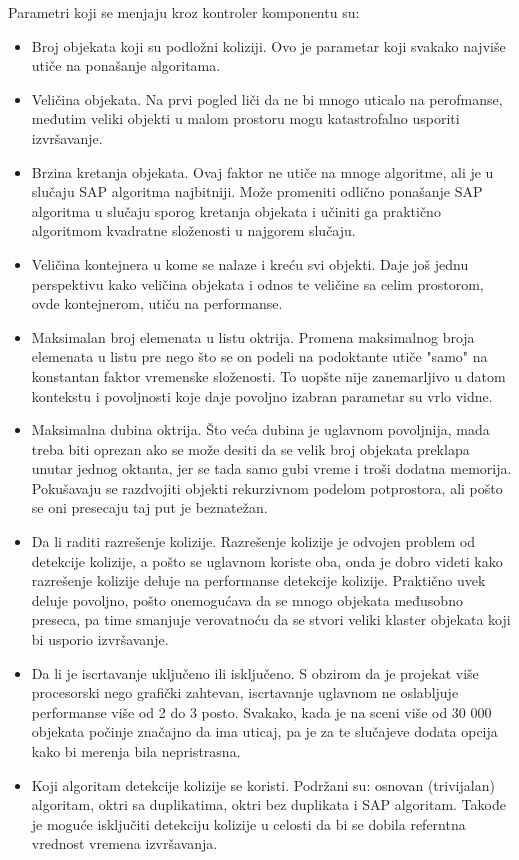 \documentclass[12pt,oneside]{memoir}
\begin{document}
Parametri koji se menjaju kroz kontroler komponentu su: 
\begin{itemize}  
	\item Broj objekata koji su podložni koliziji. 
	Ovo je parametar koji svakako najviše utiče na ponašanje algoritama.
	\item Veličina objekata. 
	Na prvi pogled liči da ne bi mnogo uticalo na perofmanse, međutim veliki objekti u malom prostoru mogu katastrofalno usporiti izvršavanje.
	\item Brzina kretanja objekata.
	Ovaj faktor ne utiče na mnoge algoritme, ali je u slučaju SAP algoritma najbitniji. Može promeniti odlično ponašanje SAP algoritma u slučaju sporog kretanja 
	objekata i učiniti ga praktično algoritmom kvadratne složenosti u najgorem slučaju.
	\item Veličina kontejnera u kome se nalaze i kreću svi objekti.
	Daje još jednu perspektivu kako veličina objekata i odnos te veličine sa celim prostorom, ovde kontejnerom, utiču na performanse.
	\item Maksimalan broj elemenata u listu oktrija.
	Promena maksimalnog broja elemenata u listu pre nego što se on podeli na podoktante utiče "samo" na konstantan faktor vremenske složenosti.
	To uopšte nije zanemarljivo u datom kontekstu i povoljnosti koje daje povoljno izabran parametar su vrlo vidne.
	\item Maksimalna dubina oktrija. Što veća dubina je uglavnom povoljnija, mada treba biti oprezan ako se može desiti 
	da se velik broj objekata preklapa unutar jednog oktanta, jer se tada samo gubi vreme i troši dodatna memorija. 
	Pokušavaju se razdvojiti objekti rekurzivnom podelom potprostora, ali pošto se oni presecaju taj put je beznatežan.
	\item Da li raditi razrešenje kolizije. 
	Razrešenje kolizije je odvojen problem od detekcije kolizije, a pošto se uglavnom koriste oba, onda je dobro videti 
	kako razrešenje kolizije deluje na performanse detekcije kolizije. Praktično uvek deluje povoljno, pošto onemogućava da se mnogo 
	objekata međusobno preseca, pa time smanjuje verovatnoću da se stvori veliki klaster objekata koji bi usporio izvršavanje.
	\item Da li je iscrtavanje uključeno ili isključeno. 
	S obzirom da je projekat više procesorski nego grafički zahtevan, iscrtavanje uglavnom ne oslabljuje performanse više od 2 do 3 posto.
	Svakako, kada je na sceni više od 30 000 objekata počinje značajno da ima uticaj, pa je za te slučajeve dodata opcija kako bi merenja bila nepristrasna.
	\item Koji algoritam detekcije kolizije se koristi. Podržani su: osnovan (trivijalan) algoritam, oktri sa duplikatima,
	oktri bez duplikata i SAP algoritam. Takođe je moguće isključiti detekciju kolizije u celosti da bi se dobila referntna vrednost vremena izvršavanja.

\end{itemize}  
\end{document}
